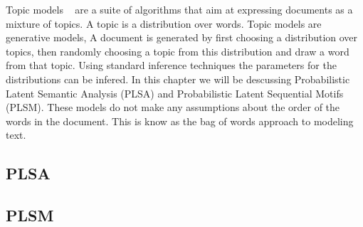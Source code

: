 Topic models ~\cite{steyvers2006probabilistic,blei2011introduction} are a suite of algorithms that aim at expressing documents as a mixture of topics. A topic is a distribution over words. Topic models are generative models, A document is generated by first choosing a distribution over topics, then randomly choosing a topic from this distribution and draw a word from that topic. Using standard inference techniques the parameters for the distributions can be infered. In this chapter we will be descussing Probabilistic Latent Semantic Analysis (PLSA) and Probabilistic Latent Sequential Motifs (PLSM). These models do not make any assumptions about the order of the words in the document. This is know as the bag of words approach to modeling text.

\subsection{PLSA}


\subsection{PLSM}
